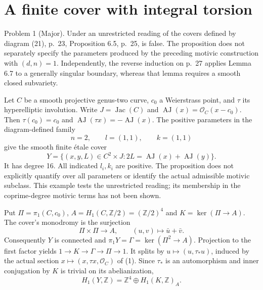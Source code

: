 \documentclass[10pt]{article}
\begin{document}
\section*{A finite cover with integral torsion}
Problem 1 (Major).  Under an unrestricted reading of the covers defined by diagram (21), p. 23, Proposition 6.5, p. 25, is false. The proposition does not separately specify the parameters produced by the preceding motivic construction with \((d,n)=1\). Independently, the reverse induction on p. 27 applies Lemma 6.7 to a generally singular boundary, whereas that lemma requires a smooth closed subvariety.\par
Let \(C\) be a smooth projective genus-two curve, \(c_0\) a Weierstrass point, and \(\tau\) its hyperelliptic involution. Write \(J=\operatorname{Jac}(C)\) and \(\operatorname{AJ}(x)=\mathcal O_C(x-c_0)\). Then \(\tau(c_0)=c_0\) and \(\operatorname{AJ}(\tau x)=-\operatorname{AJ}(x)\). The positive parameters in the diagram-defined family \[n=2,\qquad l=(1,1),\qquad k=(1,1)\] give the smooth finite étale cover \[Y=\{(x,y,L)\in C^2\times J:2L=\operatorname{AJ}(x)+\operatorname{AJ}(y)\}.
                                                        \tag{1}\] It has degree 16. All indicated \(l_i,k_i\) are positive. The proposition does not explicitly quantify over all parameters or identify the actual admissible motivic subclass. This example tests the unrestricted reading; its membership in the coprime-degree motivic terms has not been shown.\par
Put \(\Pi=\pi_1(C,c_0)\), \(A=H_1(C,\mathbb Z/2)=(\mathbb Z/2)^4\) and \(K=\ker(\Pi\to A)\). The cover’s monodromy is the surjection \[\Pi\times\Pi\longrightarrow A,\qquad(u,v)\longmapsto\bar u+\bar v.\] Consequently \(Y\) is connected and \(\pi_1Y=\Gamma=\ker(\Pi^2\to A)\). Projection to the first factor yields \(1\to K\to\Gamma\to\Pi\to1\). It splits by \(u\mapsto(u,\tau_*u)\), induced by the actual section \(x\mapsto(x,\tau x,\mathcal O_C)\) of (1). Since \(\tau_*\) is an automorphism and inner conjugation by \(K\) is trivial on its abelianization, \[H_1(Y,\mathbb Z)=\mathbb Z^4\oplus H_1(K,\mathbb Z)_A.                       \tag{2}\]\par
\end{document}
